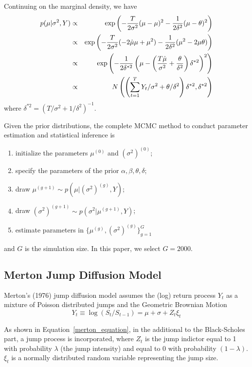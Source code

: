 \documentclass[11pt,reqno,final]{amsart}
\def\exp{\hbox{\rm exp}}
\begin{document}
Continuing on the marginal density, we have
\begin{eqnarray*}
p(\mu|\sigma^2, Y) &\propto& \exp\left(-\frac{T}{2\sigma^2}(\mu-\mu)^2-\frac{1}{2\delta^2}(\mu-\theta)^2\right) \\
                   &\propto& \exp\left(-\frac{T}{2\sigma^2}(-2\hat{\mu}\mu+\mu^2)-\frac{1}{2\delta^2}(\mu^2-2\mu\theta)\right) \\
                   &\propto& \exp\left(-\frac{1}{2\delta^{*2}} \left( \mu-\left(\frac{T\hat{\mu}}{\sigma^2} + \frac{\theta}{\delta^2}\right)\delta^{*2} \right)^2 \right) \\
                   &\propto& N\left( \left( \sum_{t=1}^T Y_t / \sigma^2 + \theta/\delta^2 \right)\delta^{*2}, \delta^{*2} \right)
\end{eqnarray*}
where $\delta^{*2} = (T/\sigma^2+1/\delta^2)^{-1}$.

Given the prior distributions, the complete MCMC method to conduct parameter estimation and statistical inference is
\begin{enumerate}
    \item initialize the parameters $\mu^{(0)}$ and $(\sigma^2)^{(0)}$;
    \item specify the parameters of the prior $\alpha, \beta, \theta, \delta$;
    \item draw $\mu^{(g+1)} \sim p(\mu|(\sigma^2)^{(g)}, Y)$;
    \item draw $(\sigma^2)^{(g+1)} \sim p(\sigma^2|\mu^{(g+1)}, Y)$;
    \item estimate parameters in $\{\mu^{(g)}, (\sigma^2)^{(g)} \}_{g=1}^{G}$
\end{enumerate}
and $G$ is the simulation size. In this paper, we select $G=2000$.

\subsection{Merton Jump Diffusion Model} \label{merton_section}
Merton's (1976) jump diffusion model assumes the (log) return process $Y_t$ as a mixture of Poisson distributed jumps and the Geometric Brownian Motion
\begin{equation}\label{merton_equation}
Y_t \equiv \log(S_{t}/S_{t-1}) = \mu + \sigma + Z_t \xi_t
\end{equation}

As shown in Equation~\ref{merton_equation}, in the additional to the Black-Scholes part, a jump process is incorporated, where $Z_t$ is the jump indictor equal to 1 with probability $\lambda$ (the jump intensity) and equal to 0 with probability $(1-\lambda)$. $\xi_t$ is a normally distributed random variable representing the jump size.
\end{document}

